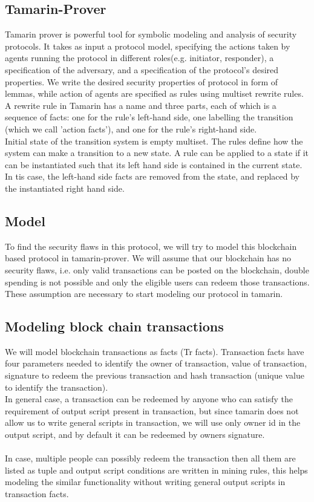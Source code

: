 \documentclass[a4paper]{article}
\begin{document}
\subsection{Tamarin-Prover}
Tamarin prover is powerful tool for symbolic modeling and analysis of security protocols. It takes as input a protocol model, specifying the actions taken by agents running the
protocol in different roles(e.g. initiator, responder), a specification of the adversary, and a specification of the protocol’s desired properties. We write the desired security properties of protocol in form of lemmas, while action of agents are specified as rules using multiset rewrite rules. \\
A rewrite rule in Tamarin has a name and three parts, each of which is a sequence of facts: one for
the rule’s left-hand side, one labelling the transition (which we call 'action facts'), and one for the rule’s right-hand side.\\
Initial state of the transition system is empty multiset. The rules define how the system can make a transition to a new state. A rule can be applied to a state if it can be instantiated such that its left hand side is contained in the current state. In tis case, the left-hand side facts are removed from the state, and replaced by the instantiated right hand side.\\

\subsection{Model}
To find the security flaws in this protocol, we will try to model this blockchain based protocol in tamarin-prover. We will assume that our blockchain has no security flaws, i.e. only valid transactions can be posted on the blockchain, double spending is not possible and only the eligible users can redeem those transactions. These assumption are necessary to start modeling our protocol in tamarin.\\
\subsection{Modeling block chain transactions}
We will model blockchain transactions as facts (Tr facts). Transaction facts have four parameters needed to identify the owner of transaction, value of transaction, signature to redeem the previous transaction and hash transaction (unique value to identify the transaction).\\
In general case, a transaction can be redeemed by anyone who can satisfy the requirement of output script present in transaction, but since tamarin does not allow us to write general scripts in transaction, we will use only owner id in the output script, and by default it can be redeemed by owners signature.\\  \\In case, multiple people can possibly redeem the transaction then all them are listed as tuple and output script conditions are written in mining rules, this helps modeling the similar functionality without writing general output scripts in transaction facts.\\
\end{document}
